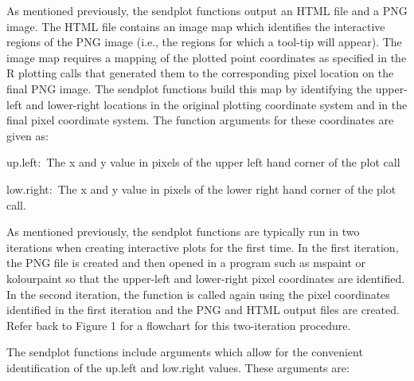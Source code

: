 \documentclass[]{article}
\begin{document}
As mentioned previously, the sendplot functions output an HTML file and a PNG image. The HTML file contains an image map which identifies the interactive regions of the PNG image (i.e., the regions for which a tool-tip will appear). The image map requires a mapping of the plotted point coordinates as specified in the R plotting calls that generated them to the corresponding pixel location on the final PNG image. The sendplot functions build this map by identifying the upper-left and lower-right locations in the original plotting coordinate system and in the final pixel coordinate system. The function arguments for these coordinates are given as:
\begin{description}
  \item{up.left:~}{The x and y value in pixels of the upper left hand
    corner of the plot call}
  \item{low.right:~}{The x and y value in pixels of the lower right hand
    corner of the plot call.}
\end{description}

\indent As mentioned previously, the sendplot functions are typically run in two iterations when creating interactive plots for the first time. In the first iteration, the PNG file is created and then opened in a program such as mspaint or kolourpaint so that the upper-left and lower-right pixel coordinates are identified. In the second iteration, the function is called again using the pixel coordinates identified in the first iteration and the PNG and HTML output files are created.  Refer back to Figure 1 for a flowchart for this two-iteration procedure. 


\indent The sendplot functions  include arguments which allow for the convenient identification of the up.left and low.right values. These arguments are:
\end{document}
